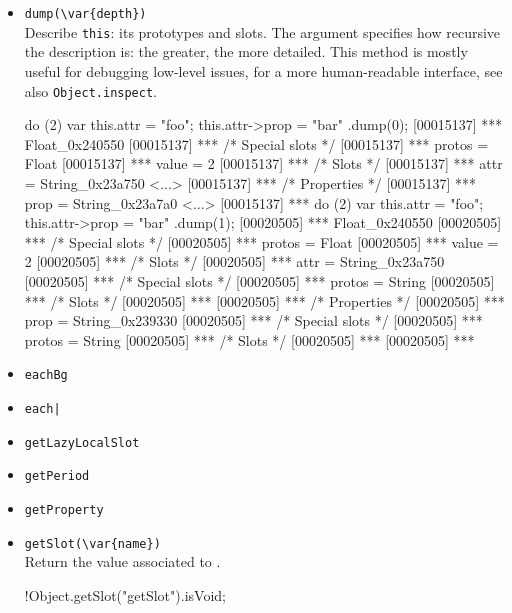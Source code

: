 \begin{itemize}
\item \lstinline|dump(\var{depth})|\\
  Describe \lstinline|this|: its prototypes and slots.  The argument
   specifies how recursive the description is: the greater,
  the more detailed.  This method is mostly useful for debugging
  low-level issues, for a more human-readable interface, see also
  \lstinline|Object.inspect|.
\begin{urbiscript}[firstnumber=last]
do (2) { var this.attr = "foo"; this.attr->prop = "bar" }.dump(0);
[00015137] *** Float_0x240550 {
[00015137] ***   /* Special slots */
[00015137] ***   protos = Float
[00015137] ***   value = 2
[00015137] ***   /* Slots */
[00015137] ***   attr = String_0x23a750 <...>
[00015137] ***     /* Properties */
[00015137] ***     prop = String_0x23a7a0 <...>
[00015137] ***   }
do (2) { var this.attr = "foo"; this.attr->prop = "bar" }.dump(1);
[00020505] *** Float_0x240550 {
[00020505] ***   /* Special slots */
[00020505] ***   protos = Float
[00020505] ***   value = 2
[00020505] ***   /* Slots */
[00020505] ***   attr = String_0x23a750 {
[00020505] ***     /* Special slots */
[00020505] ***     protos = String
[00020505] ***     /* Slots */
[00020505] ***     }
[00020505] ***     /* Properties */
[00020505] ***     prop = String_0x239330 {
[00020505] ***       /* Special slots */
[00020505] ***       protos = String
[00020505] ***       /* Slots */
[00020505] ***       }
[00020505] ***   }
\end{urbiscript}

\item \lstinline|eachBg|\\

\item \lstinline$each|$\\

\item \lstinline|getLazyLocalSlot|\\

\item \lstinline|getPeriod|\\

\item \lstinline|getProperty|\\

\item \lstinline|getSlot(\var{name})|\\
  Return the value associated to .

\begin{urbiassert}[firstnumber=last]
!Object.getSlot("getSlot").isVoid;
\end{urbiassert}


\end{itemize}
